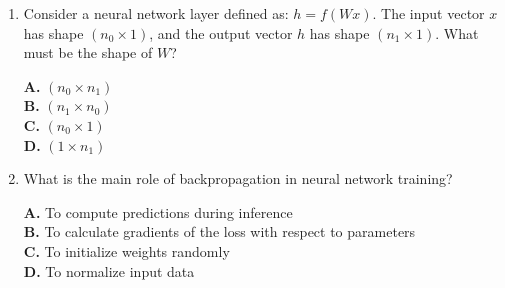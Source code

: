 \documentclass[11pt]{article}
\begin{document}
\begin{enumerate}[label=Q\arabic*., leftmargin=*]
\textbf{A.} Only the input at time $t$\\
\textbf{B.} Only the hidden state at time $t-1$\\
\textbf{C.} Both the input at time $t$ and the hidden state at time $t-1$\\
\textbf{D.} All future inputs

\item Consider a neural network layer defined as: $h = f(Wx)$. The input vector $x$ has shape $(n_0 \times 1)$, and the output vector $h$ has shape $(n_1 \times 1)$. What must be the shape of $W$?

\textbf{A.} $(n_0 \times n_1)$\\
\textbf{B.} $(n_1 \times n_0)$\\
\textbf{C.} $(n_0 \times 1)$\\
\textbf{D.} $(1 \times n_1)$

\item What is the main role of backpropagation in neural network training?

\textbf{A.} To compute predictions during inference\\
\textbf{B.} To calculate gradients of the loss with respect to parameters\\
\textbf{C.} To initialize weights randomly\\
\textbf{D.} To normalize input data

\end{enumerate}
\end{document}
